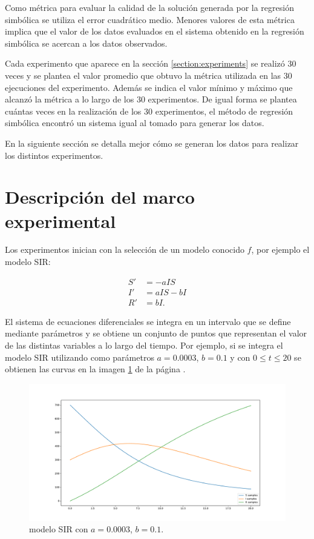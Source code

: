 Como métrica para evaluar la calidad de la solución generada por la regresión simbólica se utiliza el error cuadrático medio. Menores valores de esta métrica implica que el valor de los datos evaluados en el sistema obtenido en la regresión simbólica se acercan a los datos observados.

Cada experimento que aparece en la sección \ref{section:experiments} se realizó 30 veces y se plantea el valor promedio que obtuvo la métrica utilizada en las 30 ejecuciones del experimento. Además se indica el valor mínimo y máximo que alcanzó la métrica a lo largo de los 30 experimentos. De igual forma se plantea cuántas veces en la realización de los 30 experimentos, el método de regresión simbólica encontró un sistema igual al tomado para generar los datos.

En la siguiente sección se detalla mejor cómo se generan los datos para realizar los distintos experimentos.

\section{Descripción del marco experimental}\label{section:experimental_frame}

Los experimentos inician con la selección de un modelo conocido $f$, por ejemplo el modelo SIR:

\begin{align*}
    S' & = - aIS    \\
    I' & = aIS - bI \\
    R' & = bI.
\end{align*}

El sistema de ecuaciones diferenciales se integra en un intervalo que se define mediante parámetros y se obtiene un conjunto de puntos que representan el valor de las distintas variables a lo largo del tiempo. Por ejemplo, si se integra el modelo SIR utilizando como parámetros $a = 0.0003$, $b = 0.1$ y con $0 \leq t \leq 20$ se obtienen las curvas en la imagen \ref{fig:SIR} de la página \pageref{fig:SIR}.

\begin{figure}[h]
    \centering
    \includegraphics[width=\textwidth]{"figures/SIR.pdf"}
    \caption{modelo SIR con $a = 0.0003$, $b = 0.1$.}
    \label{fig:SIR}
\end{figure}

